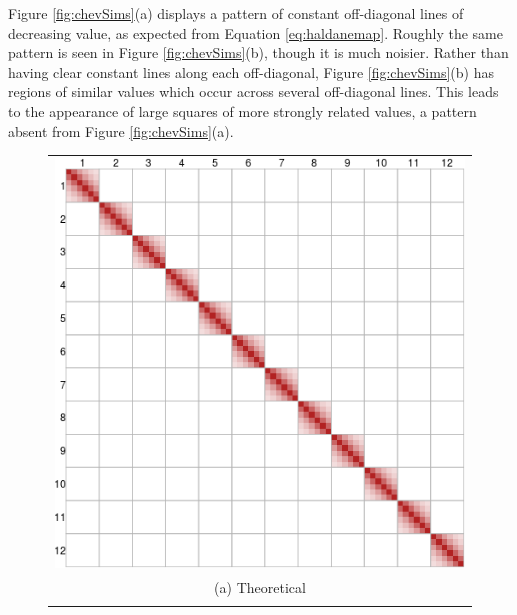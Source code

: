 \documentclass[sts]{imsart}
\begin{document}
Figure \ref{fig:chevSims}(a) displays a pattern of constant off-diagonal lines of decreasing value, as expected from Equation \ref{eq:haldanemap}. Roughly the same pattern is seen in Figure \ref{fig:chevSims}(b), though it is much noisier. Rather than having clear constant lines along each off-diagonal, Figure \ref{fig:chevSims}(b) has regions of similar values which occur across several off-diagonal lines. This leads to the appearance of large squares of more strongly related values, a pattern absent from Figure \ref{fig:chevSims}(a).

\begin{figure}[h!]
  \begin{center}
    \begin{tabular}{c}
      \includegraphics[scale=0.35]{../img/LBSimTheory.png} \\
      {\footnotesize (a) Theoretical} \\
      \\

\end{tabular}
\end{center}
\end{figure}
\end{document}

